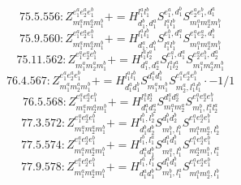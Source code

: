 \documentclass[letterpaper,10pt,fleqn,leqno,onecolumn]{article}
\begin{document}
\begin{equation} \;\;\;\;\;\;  75.5.556: Z^{e_{1}^{a}e_{2}^{a}e_{1}^{b}}_{m_{1}^{a}m_{2}^{a}m_{1}^{b}}+=H^{l_{1}^{a}l_{1}^{b}}_{d_{1}^{b},d_{1}^{a}}S^{e_{1}^{a},d_{1}^{b}}_{l_{1}^{a}l_{1}^{b}}S^{e_{2}^{a}e_{1}^{b},d_{1}^{a}}_{m_{1}^{a}m_{2}^{a}m_{1}^{b}} \end{equation}
\begin{equation} \;\;\;\;\;\;  75.9.560: Z^{e_{1}^{a}e_{2}^{a}e_{1}^{b}}_{m_{1}^{a}m_{2}^{a}m_{1}^{b}}+=H^{l_{1}^{a}l_{1}^{b}}_{d_{1}^{a},d_{1}^{b}}S^{e_{1}^{b},d_{1}^{a}}_{l_{1}^{a}l_{1}^{b}}S^{e_{1}^{a}e_{2}^{a},d_{1}^{b}}_{m_{1}^{a}m_{2}^{a}m_{1}^{b}} \end{equation}
\begin{equation} \;\;\;\;\;\;  75.11.562: Z^{e_{1}^{a}e_{2}^{a}e_{1}^{b}}_{m_{1}^{a}m_{2}^{a}m_{1}^{b}}+=H^{l_{1}^{a}l_{2}^{a}}_{d_{1}^{a},d_{2}^{a}}S^{e_{1}^{a},d_{1}^{a}}_{l_{1}^{a}l_{2}^{a}}S^{e_{2}^{a}e_{1}^{b},d_{2}^{a}}_{m_{1}^{a}m_{2}^{a}m_{1}^{b}} \end{equation}
\begin{equation} \;\;\;\;\;\;  76.4.567: Z^{e_{1}^{a}e_{2}^{a}e_{1}^{b}}_{m_{1}^{a}m_{2}^{a}m_{1}^{b}}+=H^{l_{1}^{a}l_{1}^{b}}_{d_{1}^{a}d_{1}^{b}}S^{d_{1}^{a}d_{1}^{b}}_{m_{1}^{a}m_{1}^{b}}S^{e_{1}^{a}e_{2}^{a}e_{1}^{b}}_{m_{2}^{a},l_{1}^{a}l_{1}^{b}}\cdot -1/1 \end{equation}
\begin{equation} \;\;\;\;\;\;  76.5.568: Z^{e_{1}^{a}e_{2}^{a}e_{1}^{b}}_{m_{1}^{a}m_{2}^{a}m_{1}^{b}}+=H^{l_{1}^{a}l_{2}^{a}}_{d_{1}^{a}d_{2}^{a}}S^{d_{1}^{a}d_{2}^{a}}_{m_{1}^{a}m_{2}^{a}}S^{e_{1}^{a}e_{2}^{a}e_{1}^{b}}_{m_{1}^{b},l_{1}^{a}l_{2}^{a}} \end{equation}
\begin{equation} \;\;\;\;\;\;  77.3.572: Z^{e_{1}^{a}e_{2}^{a}e_{1}^{b}}_{m_{1}^{a}m_{2}^{a}m_{1}^{b}}+=H^{l_{1}^{b},l_{2}^{b}}_{d_{1}^{b}d_{2}^{b}}S^{d_{1}^{b}d_{2}^{b}}_{m_{1}^{b},l_{1}^{b}}S^{e_{1}^{a}e_{2}^{a}e_{1}^{b}}_{m_{1}^{a}m_{2}^{a},l_{2}^{b}} \end{equation}
\begin{equation} \;\;\;\;\;\;  77.5.574: Z^{e_{1}^{a}e_{2}^{a}e_{1}^{b}}_{m_{1}^{a}m_{2}^{a}m_{1}^{b}}+=H^{l_{1}^{b},l_{1}^{a}}_{d_{1}^{a}d_{1}^{b}}S^{d_{1}^{a}d_{1}^{b}}_{m_{1}^{a},l_{1}^{b}}S^{e_{1}^{a}e_{2}^{a}e_{1}^{b}}_{m_{2}^{a}m_{1}^{b},l_{1}^{a}} \end{equation}
\begin{equation} \;\;\;\;\;\;  77.9.578: Z^{e_{1}^{a}e_{2}^{a}e_{1}^{b}}_{m_{1}^{a}m_{2}^{a}m_{1}^{b}}+=H^{l_{1}^{a},l_{1}^{b}}_{d_{1}^{a}d_{1}^{b}}S^{d_{1}^{a}d_{1}^{b}}_{m_{1}^{b},l_{1}^{a}}S^{e_{1}^{a}e_{2}^{a}e_{1}^{b}}_{m_{1}^{a}m_{2}^{a},l_{1}^{b}} \end{equation}
\end{document}
